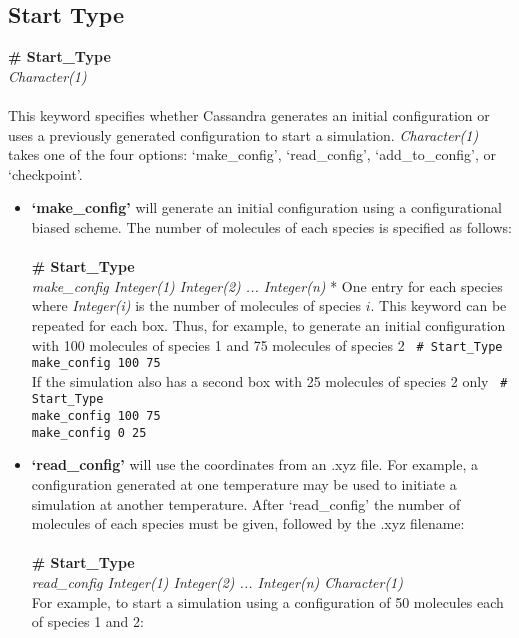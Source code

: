 \subsection{Start Type}\label{sec:Start_Type}
{\bf \# Start\_Type} \\
{\it Character(1) } \\ \\
%
This keyword specifies whether Cassandra generates an initial configuration or uses a previously generated configuration
to start a simulation. {\it Character(1)} takes one of the four options: `make\_config', `read\_config', `add\_to\_config', or `checkpoint'.
%
\begin{itemize} 
\item \textbf{`make\_config'} will generate an initial configuration using a configurational biased scheme. 
The number of molecules of each species is specified as follows: \\ \\
%
{\bf \# Start\_Type} \\
{\it make\_config Integer(1) Integer(2) ... Integer(n)} * One entry for each species
% 
 where {\it Integer(i)} is the number of molecules of species $i$. This keyword can be repeated for each box. 
 Thus, for example, to generate an initial configuration with 100 molecules of species 1 and 75 molecules of species 2
 \texttt{
 \# Start\_Type \\
 make\_config 100 75 \\}
 If the simulation also has a second box with 25 molecules of species 2 only
 \texttt{
 \# Start\_Type \\
 make\_config 100 75\\
 make\_config   0 25\\}
%
\item {\textbf{`read\_config'}} will use the coordinates from an .xyz file.
For example, a configuration generated at one temperature may be used to initiate a simulation at another temperature. 
After `read\_config' the number of molecules of each species must be given, followed by the .xyz filename: \\ \\
%
{\bf \# Start\_Type} \\
{\it read\_config Integer(1) Integer(2) ... Integer(n) Character(1)}\\
%
For example, to start a simulation using a configuration of 50 molecules each of species 1 and 2: \\ \\
%
\texttt{
}
\end{itemize}
